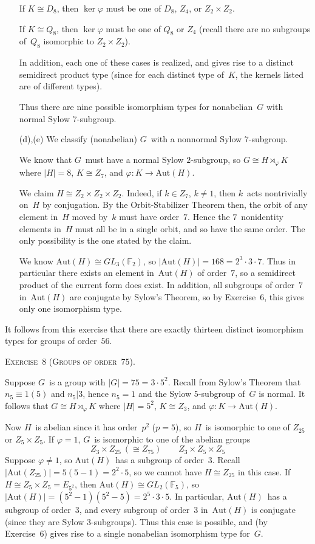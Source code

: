 \documentclass[letterpaper]{article}
\newcommand{\exercise}[1]{\goodbreak\noindent\textsc{Exercise~{#1}.}}
\newcommand{\F}{\mathbb{F}}
\newcommand{\iso}{\cong}
\newcommand{\aut}{\mathrm{Aut}}
\newcommand{\ord}[1]{|{#1}|}
\begin{document}
\begin{enumerate}[itemsep=0pt]
If $K\iso D_8$, then $\ker\varphi$ must be one of $D_8$, $Z_4$, or $Z_2\times Z_2$.

If $K\iso Q_8$, then $\ker\varphi$ must be one of $Q_8$ or $Z_4$ (recall there are no subgroups of~$Q_8$ isomorphic to $Z_2\times Z_2$).

In addition, each one of these cases is realized, and gives rise to a distinct semidirect product type (since for each distinct type of~$K$, the kernels listed are of different types).

Thus there are nine possible isomorphism types for nonabelian~$G$ with normal Sylow $7$-subgroup.

\item[(d),(e)] We classify (nonabelian) $G$~with a nonnormal Sylow $7$-subgroup.

We know that $G$~must have a normal Sylow $2$-subgroup, so $G\iso H\rtimes_{\varphi}K$ where $\ord{H}=8$, $K\iso Z_7$, and $\varphi:K\to\aut(H)$.

We claim $H\iso Z_2\times Z_2\times Z_2$. Indeed, if $k\in Z_7$, $k\ne1$, then $k$~acts nontrivially on~$H$ by conjugation. By the Orbit-Stabilizer Theorem then, the orbit of any element in~$H$ moved by~$k$ must have order~$7$. Hence the $7$~nonidentity elements in~$H$ must all be in a single orbit, and so have the same order. The only possibility is the one stated by the claim.

We know $\aut(H)\iso GL_3(\F_2)$, so $\ord{\aut(H)}=168=2^3\cdot3\cdot7$. Thus in particular there exists an element in~$\aut(H)$ of order~$7$, so a semidirect product of the current form does exist. In addition, all subgroups of order~$7$ in~$\aut(H)$ are conjugate by Sylow's Theorem, so by Exercise~6, this gives only one isomorphism type.
\end{enumerate}
\noindent It follows from this exercise that there are exactly thirteen distinct isomorphism types for groups of order~$56$.

\bigskip
\exercise{8 (Groups of order~$75$)}

Suppose $G$~is a group with $\ord{G}=75=3\cdot5^2$. Recall from Sylow's Theorem that $n_5\equiv 1(5)$ and $n_5|3$, hence $n_5=1$ and the Sylow $5$-subgroup of~$G$ is normal. It follows that $G\iso H\rtimes_{\varphi}K$ where $\ord{H}=5^2$, $K\iso Z_3$, and $\varphi:K\to\aut(H)$.

Now $H$~is abelian since it has order~$p^2$ ($p=5$), so $H$~is isomorphic to one of $Z_{25}$ or $Z_5\times Z_5$. If $\varphi=1$, $G$~is isomorphic to one of the abelian groups
$$Z_3\times Z_{25}\ (\iso Z_{75})\qquad Z_3\times Z_5\times Z_5$$
Suppose $\varphi\ne1$, so $\aut(H)$~has a subgroup of order~$3$. Recall $\ord{\aut(Z_{25})}=5(5-1)=2^2\cdot5$, so we cannot have $H\iso Z_{25}$ in this case. If $H\iso Z_5\times Z_5=E_{5^2}$, then $\aut(H)\iso GL_2(\F_5)$, so $\ord{\aut(H)}=(5^2-1)(5^2-5)=2^5\cdot 3\cdot 5$. In particular, $\aut(H)$~has a subgroup of order~$3$, and every subgroup of order~$3$ in~$\aut(H)$ is conjugate (since they are Sylow $3$-subgroups). Thus this case is possible, and (by Exercise~6) gives rise to a single nonabelian isomorphism type for~$G$.
\end{document}
